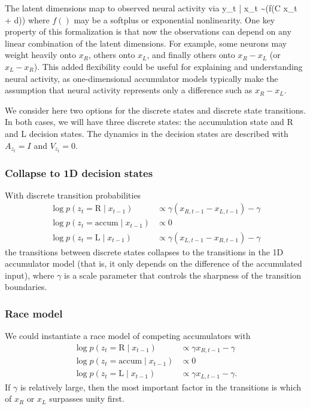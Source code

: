 \documentclass{article}
\begin{document}
The latent dimensions map to observed neural activity via
\be
y_t | x_t \sim {}(f(C x_t + d))
\ee
where $f()$ may be a softplus or exponential nonlinearity. One key property of this formalization is that now the observations can depend on any linear combination of the latent dimensions. For example, some neurons may weight heavily onto $x_R$, others onto $x_L$, and finally others onto $x_R - x_L$ (or $x_L - x_R$). This added flexibility could be useful for explaining and understanding neural activity, as one-dimensional accumulator models typically make the assumption that neural activity represents only a difference such as $x_R - x_L$. 

We consider here two options for the discrete states and discrete state transitions. In both cases, we will have three discrete states: the accumulation state and R and L decision states. The dynamics in the decision states are described with $A_{z_t} = I$ and $V_{z_t} = 0$. 

\subsubsection{Collapse to 1D decision states}
With discrete transition probabilities 
\begin{align*}
\log p(z_t = \text{R} \mid x_{t-1}) &\propto \gamma (x_{R,t-1} - x_{L,t-1}) - \gamma \\
\log p(z_t = \text{accum} \mid x_{t-1}) &\propto 0 \\
\log p(z_t = \text{L} \mid x_{t-1}) &\propto \gamma (x_{L,t-1} - x_{R,t-1}) - \gamma 
\end{align*}
the transitions between discrete states collapses to the transitions in the 1D accumulator model (that is, it only depends on the difference of the accumulated input), where $\gamma$ is a scale parameter that controls the sharpness of the transition boundaries. 

\subsubsection{Race model}
We could instantiate a race model of competing accumulators \cite{gold2007neural} with 
\begin{align*}
\log p(z_t = \text{R} \mid x_{t-1}) &\propto \gamma x_{R,t-1} - \gamma \\
\log p(z_t = \text{accum} \mid x_{t-1}) &\propto 0 \\
\log p(z_t = \text{L} \mid x_{t-1}) &\propto \gamma x_{L,t-1} - \gamma.
\end{align*}
If $\gamma$ is relatively large, then the most important factor in the transitions is which of $x_R$ or $x_L$ surpasses unity first.
\end{document}
